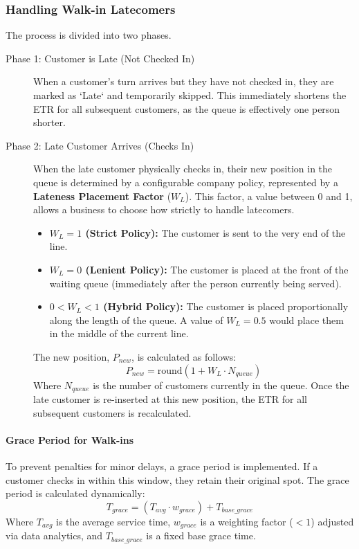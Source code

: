 \documentclass[12pt,a4paper]{report}
\begin{document}
\subsubsection{Handling Walk-in Latecomers}
The process is divided into two phases.
\begin{description}
    \item[Phase 1: Customer is Late (Not Checked In)] When a customer's turn arrives but they have not checked in, they are marked as `Late` and temporarily skipped. This immediately shortens the ETR for all subsequent customers, as the queue is effectively one person shorter.
    \item[Phase 2: Late Customer Arrives (Checks In)] When the late customer physically checks in, their new position in the queue is determined by a configurable company policy, represented by a \textbf{Lateness Placement Factor} ($W_L$). This factor, a value between 0 and 1, allows a business to choose how strictly to handle latecomers.
    \begin{itemize}
        \item \textbf{$W_L = 1$ (Strict Policy):} The customer is sent to the very end of the line.
        \item \textbf{$W_L = 0$ (Lenient Policy):} The customer is placed at the front of the waiting queue (immediately after the person currently being served).
        \item \textbf{$0 < W_L < 1$ (Hybrid Policy):} The customer is placed proportionally along the length of the queue. A value of $W_L=0.5$ would place them in the middle of the current line.
    \end{itemize}
    The new position, $P_{new}$, is calculated as follows:
    \begin{equation}
        P_{new} = \text{round}(1 + W_L \cdot N_{queue})
    \end{equation}
    Where $N_{queue}$ is the number of customers currently in the queue. Once the late customer is re-inserted at this new position, the ETR for all subsequent customers is recalculated.
\end{description}

\paragraph{Grace Period for Walk-ins} To prevent penalties for minor delays, a grace period is implemented. If a customer checks in within this window, they retain their original spot. The grace period is calculated dynamically:
\begin{equation}
    T_{grace} = (T_{avg} \cdot w_{grace}) + T_{base\_grace}
\end{equation}
Where $T_{avg}$ is the average service time, $w_{grace}$ is a weighting factor ($< 1$) adjusted via data analytics, and $T_{base\_grace}$ is a fixed base grace time.
\end{document}

